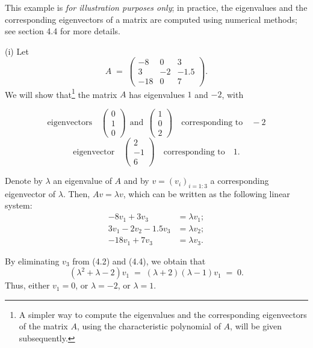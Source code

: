 \begin{examplex}
This example is \textit{for illustration purposes only}; in practice, the eigenvalues
and the corresponding eigenvectors of a matrix are computed using numerical methods; see
section 4.4 for more details.

(i) Let
\[
A \;=\; \begin{pmatrix} -8 & 0 & 3\\ 3 & -2 & -1.5\\ -18 & 0 & 7\end{pmatrix}.
\]
We will show that\footnote{A simpler way to compute the eigenvalues and the corresponding
eigenvectors of the matrix $A$, using the characteristic polynomial of $A$, will be given
subsequently.} the matrix $A$ has eigenvalues $1$ and $-2$, with

\[
\text{eigenvectors} \quad \begin{pmatrix}0\\1\\0\end{pmatrix} \ \ \text{and} \ \
\begin{pmatrix}1\\0\\2\end{pmatrix} \quad \text{corresponding to} \quad -2
\]
\[
\text{eigenvector} \quad \begin{pmatrix}2\\-1\\6\end{pmatrix} \quad
\text{corresponding to} \quad 1.
\]

Denote by $\lambda$ an eigenvalue of $A$ and by $v = (v_i)_{i=1:3}$ a corresponding
eigenvector of $\lambda$. Then, $Av = \lambda v$, which can be written as the following
linear system:
\begin{align}
-8v_1 + 3v_3 &= \lambda v_1;\\
3v_1 - 2v_2 - 1.5v_3 &= \lambda v_2;\\
-18v_1 + 7v_3 &= \lambda v_3.
\end{align}

By eliminating $v_3$ from (4.2) and (4.4), we obtain that
\[
(\lambda^2 + \lambda - 2)v_1 \;=\; (\lambda+2)(\lambda-1)v_1 \;=\; 0.
\]
Thus, either $v_1 = 0$, or $\lambda = -2$, or $\lambda = 1$.


\end{examplex}

